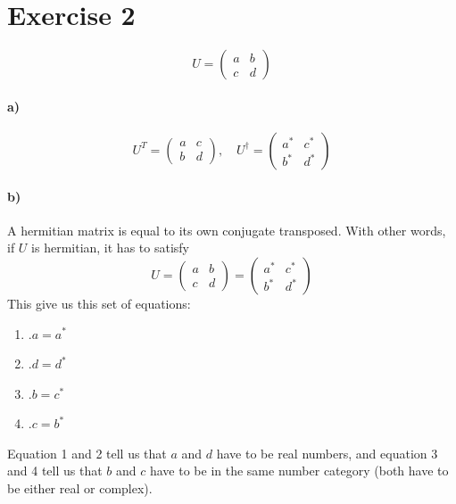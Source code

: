 \documentclass{scrartcl}
\begin{document}
\section{Exercise 2}
$$U=\begin{pmatrix}a&b\\c&d\end{pmatrix}$$
\paragraph{a)}
$$U^T=\begin{pmatrix}a&c\\b&d\end{pmatrix},\quad
U^\dagger=\begin{pmatrix}a^*&c^*\\b^*&d^*\end{pmatrix}$$
\paragraph{b)}
A hermitian matrix is equal to its own conjugate transposed. With other words, if $U$ is hermitian, it has to satisfy
$$U=\begin{pmatrix}a&b\\c&d\end{pmatrix}=\begin{pmatrix}a^*&c^*\\b^*&d^*\end{pmatrix}$$
This give us this set of equations:
\renewcommand{\labelenumi}{\roman{enumi}}
\begin{enumerate}
\item .\quad $a=a^*$
\item .\quad $d=d^*$
\item .\quad $b=c^*$
\item .\quad $c=b^*$
\end{enumerate}
Equation 1 and 2 tell us that $a$ and $d$ have to be real numbers, and equation 3 and 4 tell us that $b$ and $c$ have to be in the same number category (both have to be either real or complex).
\end{document}
